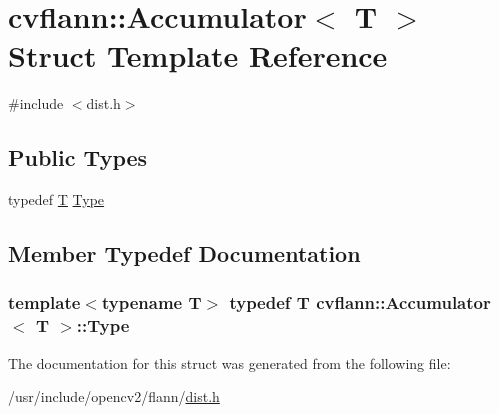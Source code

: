 \hypertarget{structcvflann_1_1Accumulator}{\section{cvflann\-:\-:Accumulator$<$ T $>$ Struct Template Reference}
\label{structcvflann_1_1Accumulator}
}


{\ttfamily \#include $<$dist.\-h$>$}

\subsection*{Public Types}
\begin{DoxyCompactItemize}
\item 
typedef \hyperlink{calib3d_8hpp_a3efb9551a871ddd0463079a808916717}{T} \hyperlink{structcvflann_1_1Accumulator_a9ce42bd623dc4709621e5aadeed80051}{Type}
\end{DoxyCompactItemize}


\subsection{Member Typedef Documentation}
\hypertarget{structcvflann_1_1Accumulator_a9ce42bd623dc4709621e5aadeed80051}{
\subsubsection[{Type}]{\setlength{\rightskip}{0pt plus 5cm}template$<$typename T$>$ typedef {\bf T} {\bf cvflann\-::\-Accumulator}$<$ {\bf T} $>$\-::{\bf Type}}}\label{structcvflann_1_1Accumulator_a9ce42bd623dc4709621e5aadeed80051}


The documentation for this struct was generated from the following file\-:\begin{DoxyCompactItemize}
\item 
/usr/include/opencv2/flann/\hyperlink{dist_8h}{dist.\-h}\end{DoxyCompactItemize}
